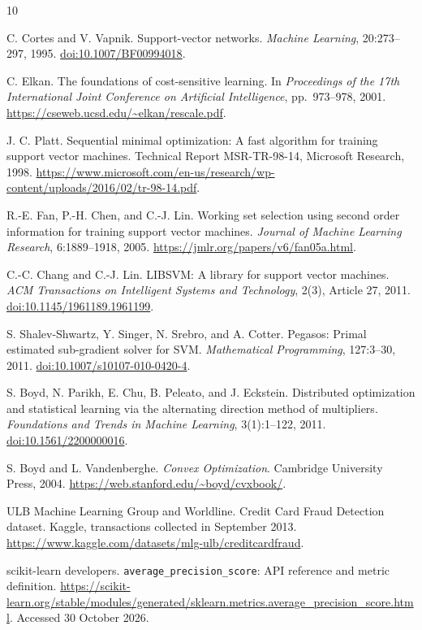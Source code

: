 \documentclass{article}
\begin{document}
\FloatBarrier
\begin{thebibliography}{10}
\small\raggedright
{}
C. Cortes and V. Vapnik.
Support-vector networks.
\emph{Machine Learning}, 20:273--297, 1995.
\href{https://doi.org/10.1007/BF00994018}{doi:10.1007/BF00994018}.

C. Elkan.
The foundations of cost-sensitive learning.
In \emph{Proceedings of the 17th International Joint Conference on Artificial Intelligence}, pp.\ 973--978, 2001.
\url{https://cseweb.ucsd.edu/~elkan/rescale.pdf}.

J. C. Platt.
Sequential minimal optimization: A fast algorithm for training support vector machines.
Technical Report MSR-TR-98-14, Microsoft Research, 1998.
\url{https://www.microsoft.com/en-us/research/wp-content/uploads/2016/02/tr-98-14.pdf}.

R.-E. Fan, P.-H. Chen, and C.-J. Lin.
Working set selection using second order information for training support vector machines.
\emph{Journal of Machine Learning Research}, 6:1889--1918, 2005.
\url{https://jmlr.org/papers/v6/fan05a.html}.

C.-C. Chang and C.-J. Lin.
LIBSVM: A library for support vector machines.
\emph{ACM Transactions on Intelligent Systems and Technology}, 2(3), Article 27, 2011.
\href{https://doi.org/10.1145/1961189.1961199}{doi:10.1145/1961189.1961199}.

S. Shalev-Shwartz, Y. Singer, N. Srebro, and A. Cotter.
Pegasos: Primal estimated sub-gradient solver for SVM.
\emph{Mathematical Programming}, 127:3--30, 2011.
\href{https://doi.org/10.1007/s10107-010-0420-4}{doi:10.1007/s10107-010-0420-4}.

S. Boyd, N. Parikh, E. Chu, B. Peleato, and J. Eckstein.
Distributed optimization and statistical learning via the alternating direction method of multipliers.
\emph{Foundations and Trends in Machine Learning}, 3(1):1--122, 2011.
\href{https://doi.org/10.1561/2200000016}{doi:10.1561/2200000016}.

S. Boyd and L. Vandenberghe.
\emph{Convex Optimization}.
Cambridge University Press, 2004.
\url{https://web.stanford.edu/~boyd/cvxbook/}.

ULB Machine Learning Group and Worldline.
Credit Card Fraud Detection dataset.
Kaggle, transactions collected in September 2013.
\url{https://www.kaggle.com/datasets/mlg-ulb/creditcardfraud}.

scikit-learn developers.
\texttt{average\_precision\_score}: API reference and metric definition.
\url{https://scikit-learn.org/stable/modules/generated/sklearn.metrics.average_precision_score.html}.
Accessed 30 October 2026.
\end{thebibliography}
\end{document}
